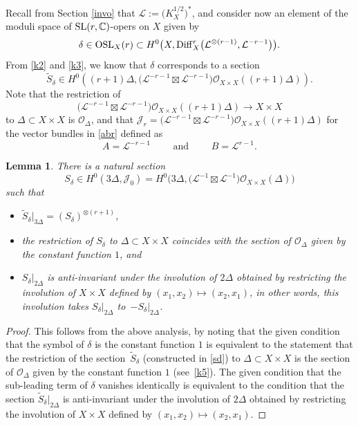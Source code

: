 \documentclass[10pt,a4paper]{amsart}
\numberwithin{equation}{section}
\newtheorem{Lemma}[Theorem]{Lemma}
\begin{document}
Recall from Section \ref{invo} that $\mathcal L := \bigl(K^{1/2}_X\bigr)^*$, and consider now an element of the moduli space of
${\rm SL}(r, {\mathbb C})$-opers on $X$ given by
\begin{equation}\label{d1}
\delta \in {\rm OSL}_X(r) \subset
H^0\bigl(X, {\rm Diff}^r_X\bigl({\mathcal L}^{\otimes (r-1)}, {\mathcal L}^{-r-1}\bigr)\bigr).
\end{equation}
From \eqref{k2} and \eqref{k3}, we know that $\delta$ corresponds to a section
\begin{equation}\label{sd}
\widetilde{S}_\delta \in H^0((r+1)\Delta, \bigl({\mathcal L}^{-r-1}\boxtimes {\mathcal L}^{-r-1}\bigr)
{\mathcal O}_{X\times X}((r+1)\Delta)).
\end{equation}
Note that the restriction of
\[
\bigl({\mathcal L}^{-r-1}\boxtimes {\mathcal L}^{-r-1}\bigr){\mathcal O}_{X\times X}((r+1)\Delta)
 \longrightarrow X\times X
\]
to $\Delta \subset X\times X$ is ${\mathcal O}_\Delta$, and that $\mathcal{J}_r =
\bigl({\mathcal L}^{-r-1}\boxtimes {\mathcal L}^{-r-1}\bigr){\mathcal O}_{X\times X}((r+1)\Delta)$ for the vector
bundles in \eqref{abr} defined as
\[A = {\mathcal L}^{-r-1}\qquad \text{ and }\qquad B = {\mathcal L}^{r-1}.\]

\begin{Lemma}
There is a natural section
\[
S_\delta \in H^0(3\Delta, \mathcal{J}_0) = H^0\bigl(3\Delta,
\bigl({\mathcal L}^{-1}\boxtimes {\mathcal L}^{-1}\bigr){\mathcal O}_{X\times X}(\Delta)\bigr)
\]
such that
\begin{itemize}\itemsep=0pt
\item $\widetilde{S}_\delta\big\vert_{3\Delta} = (S_\delta)^{\otimes (r+1)}$,

\item the restriction of $S_\delta$ to $\Delta \subset X\times X$ coincides with the section of
${\mathcal O}_\Delta$ given by the constant function $1$, and

\item $S_\delta\big\vert_{2\Delta}$ is anti-invariant under the involution of $2\Delta$ obtained by restricting
the involution of $X\times X$ defined by $(x_1, x_2) \longmapsto (x_2, x_1)$, in other words, this
involution takes $S_\delta\big\vert_{2\Delta}$ to~$-S_\delta\big\vert_{2\Delta}$.
\end{itemize}
\end{Lemma}

\begin{proof} This follows from the above analysis, by noting that the given condition that the symbol of
$\delta$ is the constant function $1$ is equivalent to the statement that the restriction of the section~$\widetilde{S}_\delta$ (constructed in \eqref{sd}) to $\Delta \subset X\times X$ is the section of
${\mathcal O}_\Delta$ given by the constant function $1$ (see~\eqref{k5}). The given condition that
the sub-leading term of $\delta$ vanishes identically is equivalent to the condition that the section
$\widetilde{S}_\delta\big\vert_{2\Delta}$ is anti-invariant under the involution of $2\Delta$ obtained by restricting
the involution of $X\times X$ defined by $(x_1, x_2) \longmapsto (x_2, x_1)$.
\end{proof}
\end{document}
